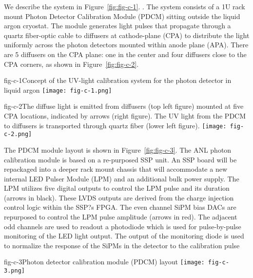 We describe the system in Figure~\ref{fig:fig-c-1}. . The system
consists of a 1U rack mount Photon Detector Calibration Module (PDCM)
sitting outside the liquid argon cryostat. The module generates light
pulses that propagate through a quartz fiber-optic cable to diffusers
at cathode-plane (CPA) to distribute the light uniformly across the
photon detectors mounted within anode plane (APA).  There are 5
diffusers on the CPA plane: one in the center and four diffusers close
to the CPA corners, as shown in Figure~\ref{fig:fig-c-2}. 

%
\begin{cdrfigure}{fig-c-1}{Concept of the UV-light calibration system for the photon
  detector in liquid argon}
\texttt{[image: fig-c-1.png]}
\end{cdrfigure}


\begin{cdrfigure}{fig-c-2}{The diffuse light is emitted from diffusers (top left figure)
  mounted at five CPA locations, indicated by arrows (right figure).
  The UV light from the PDCM to diffusers is transported through
  quartz fiber (lower left figure).}
\texttt{[image: fig-c-2.png]}
\end{cdrfigure}


The PDCM module layout is shown in Figure~\ref{fig:fig-c-3}. The ANL
photon calibration module is based on a re-purposed SSP unit.  An SSP
board will be repackaged into a deeper rack mount chassis that will
accommodate a new internal LED Pulser Module (LPM) and an additional
bulk power supply. The LPM utilizes five digital outputs to control
the LPM pulse and its duration (arrows in black).  These LVDS outputs
are derived from the charge injection control logic within the SSP?s
FPGA.  The even channel SiPM bias DACs are repurposed to control the
LPM pulse amplitude (arrows in red).  The adjacent odd channels are
used to readout a photodiode which is used for pulse-by-pulse
monitoring of the LED light output.  The output of the monitoring
diode is used to normalize the response of the SiPMs in the detector
to the calibration pulse

\begin{cdrfigure}{fig-c-3}{Photon detector calibration module (PDCM) layout}
\texttt{[image: fig-c-3.png]}
\end{cdrfigure}


